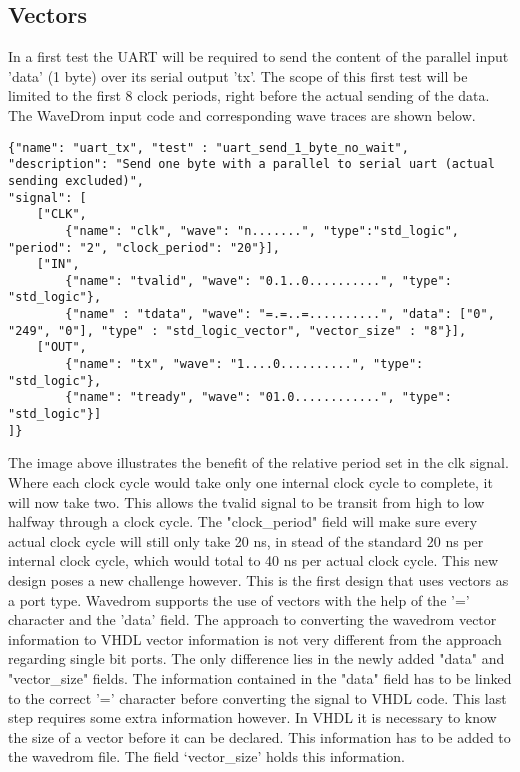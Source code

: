 \subsection{Vectors}
In a first test the UART will be required to send the content of the parallel input 'data' (1 byte) over its serial output 'tx'. The scope of this first test will be limited to the first 8 clock periods, right before the actual sending of the data. The WaveDrom input code and corresponding wave traces are shown below.
\begin{lstlisting}[style=json, caption={Source file for creating the first transmission test for the UART design in \ref{appendix:uart}}, label={json:uart_no_wait}]
{"name": "uart_tx", "test" : "uart_send_1_byte_no_wait", 
"description": "Send one byte with a parallel to serial uart (actual sending excluded)", 
"signal": [
	["CLK",
		{"name": "clk", "wave": "n.......", "type":"std_logic", "period": "2", "clock_period": "20"}],
	["IN",
		{"name": "tvalid", "wave": "0.1..0..........", "type": "std_logic"},
		{"name" : "tdata", "wave": "=.=..=..........", "data": ["0", "249", "0"], "type" : "std_logic_vector", "vector_size" : "8"}],
	["OUT",
		{"name": "tx", "wave": "1....0..........", "type": "std_logic"},
		{"name": "tready", "wave": "01.0............", "type": "std_logic"}]
]}
\end{lstlisting}\nline
{}\newpage\nline
The image above illustrates the benefit of the relative period set in the clk signal. Where each clock cycle would take only one internal clock cycle to complete, it will now take two. This allows the tvalid signal to be transit from high to low halfway through a clock cycle. The "clock\_period" field will make sure every actual clock cycle will still only take 20 ns, in stead of the standard 20 ns per internal clock cycle, which would total to 40 ns per actual clock cycle. 
\npar
This new design poses a new challenge however. This is the first design that uses vectors as a port type. Wavedrom supports the use of vectors with the help of the '=' character and the 'data' field. The approach to converting the wavedrom vector information to VHDL vector information is not very different from the approach regarding single bit ports. The only difference lies in the newly added "data" and "vector\_size" fields. The information contained in the "data" field has to be linked to the correct '=' character before converting the signal to VHDL code. This last step requires some extra information however. In VHDL it is necessary to know the size of a vector before it can be declared. This information has to be added to the wavedrom file. The field ‘vector\_size’ holds this information.
\newpage
